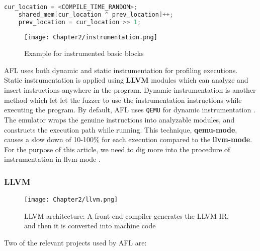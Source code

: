 \begin{lstlisting}[language=C++,style=CodeStyle,label={lst:hash},caption={Select element and update in shared\_mem}]
    cur_location = <COMPILE_TIME_RANDOM>;
    shared_mem[cur_location ^ prev_location]++; 
    prev_location = cur_location >> 1;
\end{lstlisting}

\begin{figure}[htpb]
    \texttt{[image: Chapter2/instrumentation.png]}
    \centering
    \captionsetup{justification=centering}
    \caption{Example for instrumented basic blocks}
    \label{fig:instrumentation}
\end{figure}

AFL uses both dynamic and static instrumentation for profiling executions. Static instrumentation is applied using \textbf{LLVM} modules which can analyze and insert instructions anywhere in the program. Dynamic instrumentation is another method which let let the fuzzer to use the instrumentation instructions while executing the program. By default, AFL uses \texttt{QEMU} for dynamic instrumentation \cite{afl_qemu}. The emulator wraps the genuine instructions into analyzable modules, and constructs the execution path while running. This technique, \textbf{qemu-mode}, causes a slow down of 10-100\% for each execution compared to the \textbf{llvm-mode}. For the purpose of this article, we need to dig more into the procedure of instrumentation in llvm-mode \cite{afl-llvm}.

\subsubsection{LLVM}
\label{subsub:llvm}

\begin{figure}[!b]
    \texttt{[image: Chapter2/llvm.png]}
    \centering
    \captionsetup{justification=centering}
    \caption{LLVM architecture: A front-end compiler generates the LLVM IR, and then it is converted into machine code \cite{omni_sci}}
    \label{fig:llvm}
\end{figure}

 \cite{llvm} Two of the relevant projects used by AFL are:

